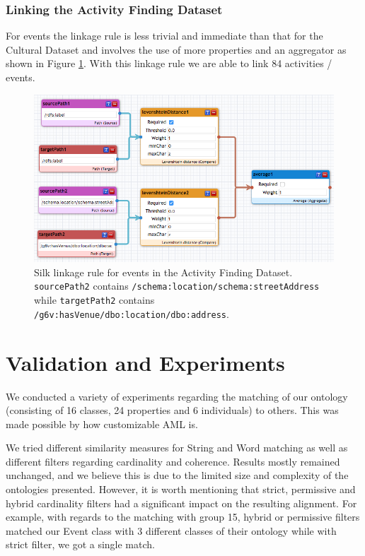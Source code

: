 \documentclass[runningheads,a4paper]{../../StyleFiles/llncs}
\begin{document}
\subsubsection{Linking the Activity Finding Dataset}
For events the linkage rule is less trivial and immediate than that for the
Cultural Dataset and involves the use of more properties and an aggregator as
shown in Figure \ref{fig:link_event_g15}. With this linkage rule we are able to
link 84 activities / events.

\begin{figure}[h]
	\centering
	\includegraphics[width=1\textwidth]{img/link_event_g15.png}
	\caption{Silk linkage rule for events in the Activity Finding Dataset.
		\texttt{sourcePath2} contains
		\texttt{/schema:location/schema:streetAddress} while
		\texttt{targetPath2} contains
		\texttt{/g6v:hasVenue/dbo:location/dbo:address}.}
	\label{fig:link_event_g15}
\end{figure}

\section{Validation and Experiments}
We conducted a variety of experiments regarding the matching of our ontology (consisting of 16 classes, 24 properties and 6 individuals) to others. This was made possible by how customizable AML is.

We tried different similarity measures for String and Word matching as well as different filters regarding cardinality and coherence. Results mostly remained unchanged, and we believe this is due to the limited size and complexity of the ontologies presented. However, it is worth mentioning that strict, permissive and hybrid cardinality filters had a significant impact on the resulting alignment. For example, with regards to the matching with group 15, hybrid or permissive filters matched our Event class with 3 different classes of their ontology while with strict filter, we got a single match. 
\end{document}
